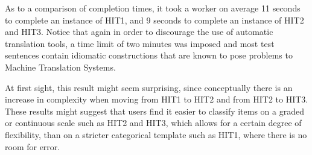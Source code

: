 \documentclass[11pt, a4paper,onecolumn]{article}
\begin{document}
As to a comparison of completion times, it took a worker on average 11 seconds to complete an instance of HIT1, and 9 seconds to complete an instance of HIT2 and HIT3. Notice that again in order to discourage the use of automatic translation tools, a time limit of two minutes was  imposed and most test sentences contain idiomatic constructions that are known to pose problems to Machine Translation Systems.

At first sight, this result might seem surprising, since conceptually there is an increase in complexity when moving from HIT1 to HIT2 and from HIT2 to HIT3. These results might suggest that users find it easier to classify items on a graded or continuous scale such as HIT2 and HIT3, which allows for a certain degree of flexibility, than on a stricter categorical template such as HIT1, where there is no room for error.
\end{document}
